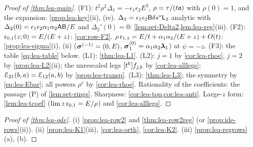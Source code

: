 \begin{proof}[Proof of \cref{thm:lea-main}]
(F1): $t^2\rho^2\Delta_1 = -\epsilon_1\epsilon_2E^3$, $\rho = \tau/(t\mathfrak{a})$ with $\rho(0) = 1$, and the expansion: \cref{prop:lea-key}(ii), (iv). $\Delta_2 = \epsilon_1\epsilon_2\mathsf{B}\delta s^{\ast}\mathsf{L}_2$ analytic with $\Delta_2(0) = \epsilon_1\epsilon_2\alpha_1\alpha_2\mathsf{A}\mathsf{B}/E$ and $\Delta_2'(0) = 0$: \cref{lem:set-Delta2,lem:lea-reg}(iii).
(F2): $\mathrm{r}_{0,1}(z;0) = E/(E+z)$: \cref{cor:row-F2}. $\rho\,\mathrm{r}_{1,1} = E/t + \alpha_1\alpha_2/(E+z) + O(t)$: \cref{prop:lea-sigma}(i), (ii) ($\boldsymbol{\sigma}^{(-1)} = (0,E)$, $\boldsymbol{\sigma}^{(0)}_1 = \alpha_1\alpha_2\boldsymbol{\lambda}_1$) at $\psi = -z$.
(F3): the table \eqref{eq:lea-table} below.
(L1): \cref{thm:lea-L1}.
(L2): $j = 1$ by \cref{cor:lea-rhoe}, $j = 2$ by \cref{prop:lea-L2}(ii); the unrescaled legs $[t^k]f_{j,b}$ by \cref{cor:lea-alllegs}; $\mathcal{E}_{21}(b,a) = \mathcal{E}_{12}(a,b)$ by \cref{prop:lea-transp}.
(L3): \cref{thm:lea-L3}; the symmetry by \eqref{eq:lea-Ebar}; all powers $\rho^e$ by \cref{cor:lea-rhoe}.
Rationality of the coefficients: the passage (P) of \cref{lem:set-rings}. Sharpness: \cref{cor:lea-top,cor:lea-anti}. Large-$z$ form: \cref{lem:lea-tcoef} ($\lim z\,\mathrm{r}_{0,1} = E/\rho$) and \cref{cor:lea-alllegs}.
\end{proof}

\begin{proof}[Proof of \cref{thm:lea-qde}]
(i) \cref{prop:lea-row2} and \cref{thm:lea-row2reg} (or \cref{prop:ide-rows}(ii)). (ii) \cref{prop:lea-K1}(iii), \cref{cor:lea-orth}, \cref{cor:lea-K2}. (iii) \cref{prop:lea-regrows}(a), (b).
\end{proof}

